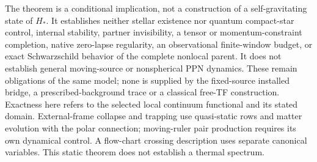 The theorem is a conditional implication, not a construction of a
self-gravitating state of $H_*$.  It establishes neither stellar
existence nor quantum compact-star control, internal stability,
partner invisibility, a tensor or momentum-constraint completion,
native zero-lapse regularity, an observational finite-window budget,
or exact Schwarzschild behavior of the complete nonlocal parent.
It does not establish general moving-source or nonspherical PPN
dynamics.  These remain obligations of the same model; none is
supplied by the fixed-source installed bridge, a prescribed-background
trace or a classical free-TF construction.  Exactness here refers to
the selected local continuum functional and its stated domain.
External-frame collapse and trapping use quasi-static rows and
matter evolution with the polar connection; moving-ruler pair
production requires its own dynamical control.  A flow-chart crossing
description uses separate canonical variables.  This static theorem
does not establish a thermal spectrum.

